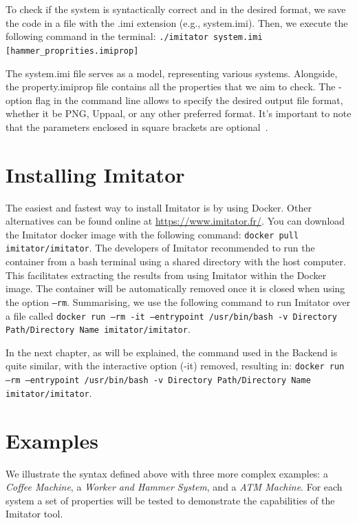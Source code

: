 To check if the system is syntactically correct and in the desired format, we save the code in a file with the .imi extension (e.g., system.imi). Then, we execute the following command in the terminal: \texttt{./imitator system.imi [hammer\_proprities.imiprop]}

 

The system.imi file serves as a model, representing various systems. Alongside, the property.imiprop file contains all the properties that we aim to check. The -option flag in the command line allows to specify the desired output file format, whether it be PNG, Uppaal, or any other preferred format. It's important to note that the parameters enclosed in square brackets are optional~\cite{IMITATOR}.

\section{Installing Imitator}
The easiest and fastest way to install Imitator is by using Docker. Other alternatives can be found online at \url{https://www.imitator.fr/}. You can download the Imitator docker image with the following command: \texttt{docker pull imitator/imitator}. The developers of Imitator recommended to run the container from a bash terminal using a shared directory with the host computer. This facilitates extracting the results from using Imitator within the Docker image.
The container will be automatically removed once it is closed when using the option \texttt{--rm}. Summarising, we use the following command to run Imitator over a file called 
\texttt{docker run --rm -it --entrypoint
/usr/bin/bash -v Directory Path/Directory Name imitator/imitator}.

In the next chapter, as will be explained, the command used in the Backend is quite similar, with the interactive option (-it) removed, resulting in: \texttt{docker run --rm --entrypoint /usr/bin/bash -v Directory Path/Directory Name imitator/imitator}.


\section{Examples}\label{sec:examples}

We illustrate the syntax defined above with three more complex examples:
a \emph{Coffee Machine}, a \emph{Worker and Hammer System}, and a \emph{ATM Machine}. For each system a set of properties will be tested to demonstrate the capabilities of the Imitator tool.

